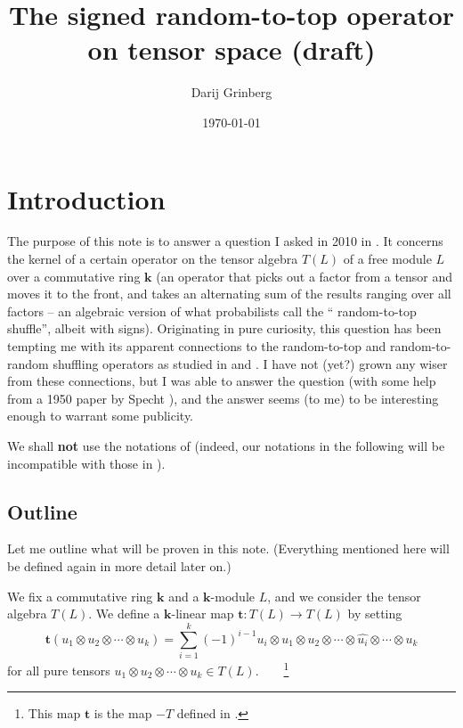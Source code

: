 \documentclass[numbers=enddot,12pt,final,onecolumn,notitlepage]{scrartcl}%
\theoremstyle{definition}
\let\sumnonlimits\sum
\renewcommand{\sum}{\sumnonlimits\limits}
\begin{document}
\title{The signed random-to-top operator on tensor space (draft)}
\author{Darij Grinberg}
\date{\today}
\maketitle

\section{Introduction}

The purpose of this note is to answer a question I asked in 2010 in \cite{mo}.
It concerns the kernel of a certain operator on the tensor algebra $T\left(
L\right)  $ of a free module $L$ over a commutative ring $\mathbf{k}$ (an
operator that picks out a factor from a tensor and moves it to the front, and
takes an alternating sum of the results ranging over all factors -- an
algebraic version of what probabilists call the \textquotedblleft
random-to-top shuffle\textquotedblright, albeit with signs). Originating in
pure curiosity, this question has been tempting me with its apparent
connections to the random-to-top and random-to-random shuffling operators as
studied in \cite{rsw} and \cite{schocker}. I have not (yet?) grown any wiser
from these connections, but I was able to answer the question (with some help
from a 1950 paper by Specht \cite{specht}), and the answer seems (to me) to be
interesting enough to warrant some publicity.

We shall \textbf{not} use the notations of \cite{mo} (indeed, our notations in
the following will be incompatible with those in \cite{mo}).

\subsection{Outline}

Let me outline what will be proven in this note. (Everything mentioned here
will be defined again in more detail later on.)

We fix a commutative ring $\mathbf{k}$ and a $\mathbf{k}$-module $L$, and we
consider the tensor algebra $T\left(  L\right)  $. We define a $\mathbf{k}%
$-linear map $\mathbf{t}:T\left(  L\right)  \rightarrow T\left(  L\right)  $
by setting%
\[
\mathbf{t}\left(  u_{1}\otimes u_{2}\otimes\cdots\otimes u_{k}\right)
=\sum_{i=1}^{k}\left(  -1\right)  ^{i-1}u_{i}\otimes u_{1}\otimes u_{2}%
\otimes\cdots\otimes\widehat{u_{i}}\otimes\cdots\otimes u_{k}%
\]
for all pure tensors $u_{1}\otimes u_{2}\otimes\cdots\otimes u_{k}\in T\left(
L\right)  $.\ \ \ \ \footnote{This map $\mathbf{t}$ is the map $-T$ defined in
\cite{mo}.}
\end{document}

